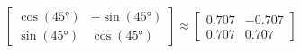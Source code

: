 \documentclass[preview]{standalone}
\begin{document}
\begin{align*}
\begin{bmatrix} \cos(45°) & -\sin(45°) \\ \sin(45°) & \cos(45°) \end{bmatrix} \approx \begin{bmatrix} 0.707 & -0.707 \\ 0.707 & 0.707 \end{bmatrix}
\end{align*}
\end{document}
